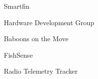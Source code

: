 \item Smartfin
\item Hardware Development Group
\item Baboons on the Move
\item FishSense
\item Radio Telemetry Tracker

